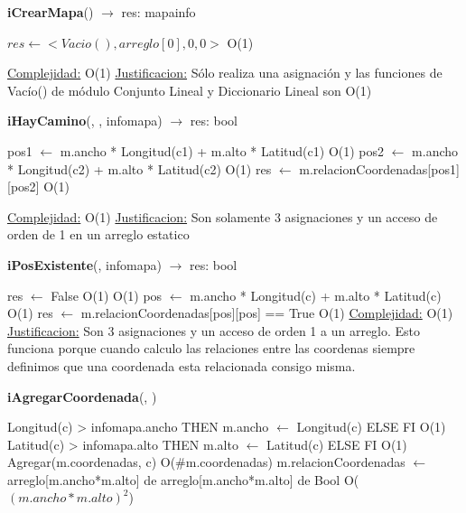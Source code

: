 \begin{Algoritmos}

\begin{algorithm}[H]{\textbf{iCrearMapa}() $\to$ res: mapainfo}
	\begin{algorithmic}[1]
		\State $res \gets <Vacio(), arreglo[0], 0, 0>$ \Comment O(1)

		\medskip
		\Statex \underline{Complejidad:} O(1)
			\Statex \underline{Justificacion:} Sólo realiza una asignación y las funciones de Vac\'io() de m\'odulo Conjunto Lineal y Diccionario Lineal son O(1)
	\end{algorithmic}
\end{algorithm}

\begin{algorithm}[H]{\textbf{iHayCamino}(, ,  {infomapa}) $\to$ res: bool}
	\begin{algorithmic}[1]
		\State pos1 $\gets$ m.ancho * Longitud(c1) + m.alto * Latitud(c1) \Comment O(1)
		\State pos2 $\gets$ m.ancho * Longitud(c2) + m.alto * Latitud(c2) \Comment O(1)
		\State res $\gets$ m.relacionCoordenadas[pos1][pos2] \Comment O(1)

		\medskip
		\Statex \underline{Complejidad:} O(1)
			\Statex \underline{Justificacion:} Son solamente 3 asignaciones y un acceso de orden de 1 en un arreglo estatico
	\end{algorithmic}
\end{algorithm}

\begin{algorithm}[H]{\textbf{iPosExistente}(,  {infomapa}) $\to$ res: bool}
	\begin{algorithmic}[1]
		\State res $\gets$ False \Comment O(1)
		 \Comment O(1)
		\State pos $\gets$ m.ancho * Longitud(c) + m.alto * Latitud(c) \Comment O(1)
		\State res $\gets$ m.relacionCoordenadas[pos][pos] == True \Comment O(1)
		\Else
		\EndIf
		\medskip
		\Statex \underline{Complejidad:} O(1)
			\Statex \underline{Justificacion:} Son 3 asignaciones y un acceso de orden 1 a un arreglo. Esto funciona porque cuando calculo las relaciones entre las coordenas siempre definimos que una coordenada esta relacionada consigo misma.
	\end{algorithmic}
\end{algorithm}

\begin{algorithm}[H]{\textbf{iAgregarCoordenada}(, )}
	\begin{algorithmic}[1]
		\State \IF Longitud(c) > infomapa.ancho THEN m.ancho $\gets$ Longitud(c) ELSE FI \Comment O(1)
		\State \IF Latitud(c) > infomapa.alto THEN m.alto $\gets$ Latitud(c) ELSE FI \Comment O(1)
		\State Agregar(m.coordenadas, c) \Comment O($\#$m.coordenadas)
		\State m.relacionCoordenadas $\gets$ arreglo[m.ancho*m.alto] de arreglo[m.ancho*m.alto] de Bool \Comment O($(m.ancho*m.alto)^2$)



\end{algorithmic}
\end{algorithm}
\end{Algoritmos}
